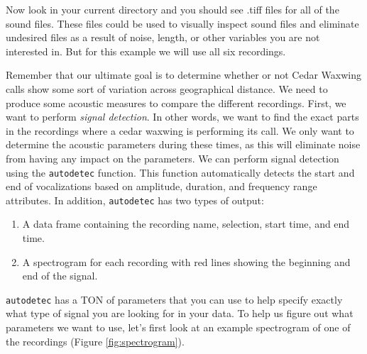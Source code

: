 \documentclass[
]{krantz}
\providecommand{\tightlist}{%
  \setlength{\itemsep}{0pt}\setlength{\parskip}{0pt}}
\begin{document}
Now look in your current directory and you should see .tiff files for all of the sound files. These files could be used to visually inspect sound files and eliminate undesired files as a result of noise, length, or other variables you are not interested in. But for this example we will use all six recordings.

Remember that our ultimate goal is to determine whether or not Cedar Waxwing calls show some sort of variation across geographical distance. We need to produce some acoustic measures to compare the different recordings. First, we want to perform \emph{signal detection}. In other words, we want to find the exact parts in the recordings where a cedar waxwing is performing its call. We only want to determine the acoustic parameters during these times, as this will eliminate noise from having any impact on the parameters. We can perform signal detection using the \texttt{autodetec} function. This function automatically detects the start and end of vocalizations based on amplitude, duration, and frequency range attributes. In addition, \texttt{autodetec} has two types of output:

\begin{enumerate}
\def\labelenumi{\arabic{enumi}.}
\tightlist
\item
  A data frame containing the recording name, selection, start time, and end time.
\item
  A spectrogram for each recording with red lines showing the beginning and end of the signal.
\end{enumerate}

\texttt{autodetec} has a TON of parameters that you can use to help specify exactly what type of signal you are looking for in your data. To help us figure out what parameters we want to use, let's first look at an example spectrogram of one of the recordings (Figure \ref{fig:spectrogram}).
\end{document}
